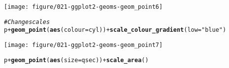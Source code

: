 \documentclass[a4paper,titlepage]{tufte-handout}\usepackage[]{graphicx}\usepackage[]{color}
\makeatletter
\def\maxwidth{ %
  \ifdim\Gin@nat@width>\linewidth
    \linewidth
  \else
    \Gin@nat@width
  \fi
}
\newcommand{\hlstr}[1]{\textcolor[rgb]{0.192,0.494,0.8}{#1}}%
\newcommand{\hlcom}[1]{\textcolor[rgb]{0.678,0.584,0.686}{\textit{#1}}}%
\newcommand{\hlopt}[1]{\textcolor[rgb]{0,0,0}{#1}}%
\newcommand{\hlstd}[1]{\textcolor[rgb]{0.345,0.345,0.345}{#1}}%
\newcommand{\hlkwc}[1]{\textcolor[rgb]{0.333,0.667,0.333}{#1}}%
\newcommand{\hlkwd}[1]{\textcolor[rgb]{0.737,0.353,0.396}{\textbf{#1}}}%
\newenvironment{kframe}{%
 \def\at@end@of@kframe{}%
 \ifinner\ifhmode%
  \def\at@end@of@kframe{\end{minipage}}%
  \begin{minipage}{\columnwidth}%
 \fi\fi%
 \def\FrameCommand##1{\hskip\@totalleftmargin \hskip-\fboxsep
 \colorbox{shadecolor}{##1}\hskip-\fboxsep
     \hskip-\linewidth \hskip-\@totalleftmargin \hskip\columnwidth}%
 \MakeFramed {\advance\hsize-\width
   \@totalleftmargin\z@ \linewidth\hsize
   \@setminipage}}%
 {\par\unskip\endMakeFramed%
 \at@end@of@kframe}
\newenvironment{knitrout}{}{} %
\makeatother
\begin{document}
\begin{knitrout}
\begin{kframe}
\end{kframe}
\texttt{[image: figure/021-ggplot2-geoms-geom\_point6]} 
\begin{kframe}\begin{alltt}
\hlcom{# Change scales}
\hlstd{p} \hlopt{+} \hlkwd{geom_point}\hlstd{(}\hlkwd{aes}\hlstd{(}\hlkwc{colour} \hlstd{= cyl))} \hlopt{+} \hlkwd{scale_colour_gradient}\hlstd{(}\hlkwc{low} \hlstd{=} \hlstr{"blue"}\hlstd{)}
\end{alltt}
\end{kframe}
\texttt{[image: figure/021-ggplot2-geoms-geom\_point7]} 
\begin{kframe}\begin{alltt}
\hlstd{p} \hlopt{+} \hlkwd{geom_point}\hlstd{(}\hlkwd{aes}\hlstd{(}\hlkwc{size} \hlstd{= qsec))} \hlopt{+} \hlkwd{scale_area}\hlstd{()}
\end{alltt}



\end{kframe}
\end{knitrout}
\end{document}
